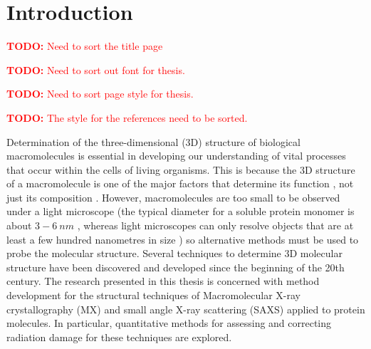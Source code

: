 \chapter{Introduction}
\label{chap:Introduction}
\textcolor{red}{
\begin{myenumerate}
    \item \hypertarget{todo:SortTitlePage}{\textbf{TODO:} Need to sort the title page}
    \item \hypertarget{todo:SortTextFont}{\textbf{TODO:} Need to sort out font for thesis.}
    \item \hypertarget{todo:SortPageStyle}{\textbf{TODO:} Need to sort page style for thesis.}
    \item \hypertarget{todo:SortReferenceStyle}{\textbf{TODO:} The style for the references need to be sorted.}
\end{myenumerate}
}
Determination of the three-dimensional (3D) structure of biological macromolecules is essential in developing our understanding of vital processes that occur within the cells of living organisms.
This is because the 3D structure of a macromolecule is one of the major factors that determine its function \cite[s~3.6]{berg2002}, not just its composition \cite{hegyi1999}.
However, macromolecules are too small to be observed under a light microscope (the typical diameter for a soluble protein monomer is about $3-6\ nm$ \cite{Philips2015}, whereas light microscopes can only resolve objects that are at least a few hundred nanometres in size \cite[p~54]{starr2010}) so alternative methods must be used to probe the molecular structure.
Several techniques to determine 3D molecular structure have been discovered and developed since the beginning of the 20th century.
The research presented in this thesis is concerned with method development for the structural techniques of Macromolecular X-ray crystallography (MX) and small angle X-ray scattering (SAXS) applied to protein molecules.
In particular, quantitative methods for assessing and correcting radiation damage for these techniques are explored.
